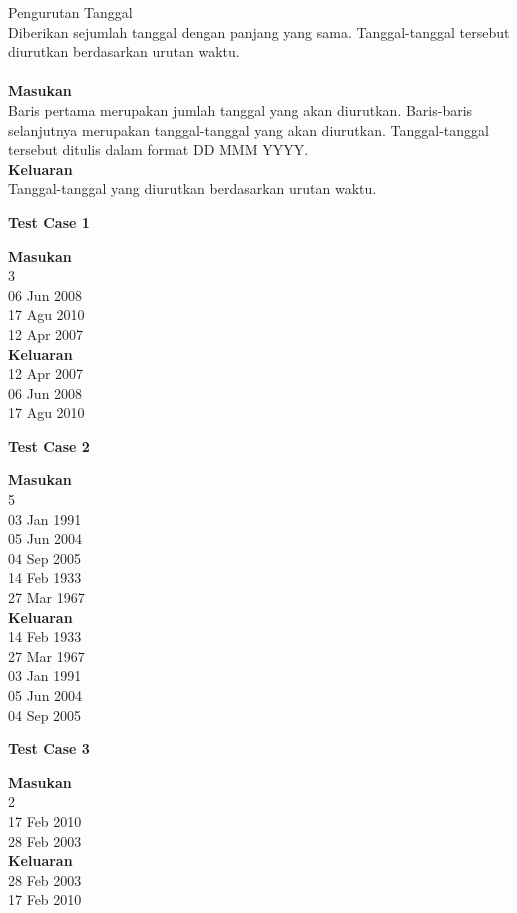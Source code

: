 \newpage

\begin{permasalahan}{Pengurutan Tanggal}\\
Diberikan sejumlah tanggal dengan panjang yang sama. Tanggal-tanggal tersebut diurutkan berdasarkan urutan waktu.\\
	\\
	\textbf{Masukan}\\
	Baris pertama merupakan jumlah tanggal yang akan diurutkan. Baris-baris selanjutnya merupakan tanggal-tanggal yang akan diurutkan. Tanggal-tanggal tersebut ditulis dalam format DD MMM YYYY.\\
	\textbf{Keluaran}\\
	Tanggal-tanggal yang diurutkan berdasarkan urutan waktu.\\
	\begin{center}
	\textbf{Test Case 1}\\
	\end{center}
	\textbf{Masukan}\\
	3\\
06 Jun 2008\\
17 Agu 2010\\
12 Apr 2007\\

	\textbf{Keluaran}\\
12 Apr 2007\\
06 Jun 2008\\
17 Agu 2010\\
	\begin{center}
	\textbf{Test Case 2}\\
	\end{center}
	\textbf{Masukan}\\
5\\
03 Jan 1991\\
05 Jun 2004\\
04 Sep 2005\\
14 Feb 1933\\
27 Mar 1967\\

	\textbf{Keluaran}\\
14 Feb 1933\\
27 Mar 1967\\
03 Jan 1991\\
05 Jun 2004\\
04 Sep 2005\\
	\begin{center}
	\textbf{Test Case 3}\\
	\end{center}
	\textbf{Masukan}\\
2\\
17 Feb 2010\\
28 Feb 2003\\

	\textbf{Keluaran}\\
28 Feb 2003\\
17 Feb 2010\\
\end{permasalahan}

